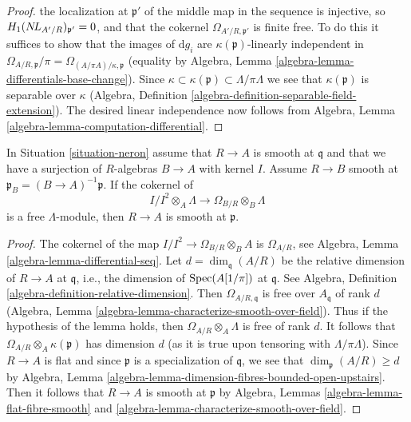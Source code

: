 \begin{proof}
the localization at $\mathfrak p'$ of the middle map in the sequence is
injective, so $H_1(\mathop{N\!L}\nolimits_{A'/R})_{\mathfrak p'} = 0$, and
that the cokernel $\Omega_{A'/R, \mathfrak p'}$ is finite free.
To do this it suffices to show
that the images of $\text{d}g_i$ are $\kappa(\mathfrak p)$-linearly
independent in
$\Omega_{A/R, \mathfrak p}/\pi = \Omega_{(A/\pi A)/\kappa, \mathfrak p}$
(equality by Algebra, Lemma \ref{algebra-lemma-differentials-base-change}).
Since $\kappa \subset \kappa(\mathfrak p) \subset \Lambda/\pi \Lambda$
we see that $\kappa(\mathfrak p)$ is separable over $\kappa$
(Algebra, Definition \ref{algebra-definition-separable-field-extension}).
The desired linear independence now follows from
Algebra, Lemma \ref{algebra-lemma-computation-differential}.
\end{proof}

\begin{lemma}
\label{lemma-neron-when-smooth}
In Situation \ref{situation-neron} assume that $R \to A$ is smooth
at $\mathfrak q$ and that we have a surjection of $R$-algebras
$B \to A$ with kernel $I$. Assume $R \to B$ smooth at
$\mathfrak p_B = (B \to A)^{-1}\mathfrak p$. If the cokernel of
$$
I/I^2 \otimes_A \Lambda \to \Omega_{B/R} \otimes_B \Lambda
$$
is a free $\Lambda$-module, then $R \to A$ is smooth at $\mathfrak p$.
\end{lemma}

\begin{proof}
The cokernel of the map $I/I^2 \to \Omega_{B/R} \otimes_B A$
is $\Omega_{A/R}$, see Algebra, Lemma \ref{algebra-lemma-differential-seq}.
Let $d = \dim_\mathfrak q(A/R)$ be the relative dimension of $R \to A$
at $\mathfrak q$, i.e., the dimension of $\mathop{\mathrm{Spec}}(A[1/\pi])$ at $\mathfrak q$.
See Algebra, Definition \ref{algebra-definition-relative-dimension}.
Then $\Omega_{A/R, \mathfrak q}$ is free over $A_\mathfrak q$ of rank $d$
(Algebra, Lemma \ref{algebra-lemma-characterize-smooth-over-field}).
Thus if the hypothesis of the lemma holds,
then $\Omega_{A/R} \otimes_A \Lambda$ is free of rank $d$.
It follows that $\Omega_{A/R} \otimes_A \kappa(\mathfrak p)$
has dimension $d$ (as it is true upon tensoring with $\Lambda/\pi \Lambda$).
Since $R \to A$ is flat and since $\mathfrak p$
is a specialization of $\mathfrak q$, we see that
$\dim_\mathfrak p(A/R) \geq d$ by Algebra, Lemma
\ref{algebra-lemma-dimension-fibres-bounded-open-upstairs}.
Then it follows that $R \to A$ is smooth at $\mathfrak p$ by
Algebra, Lemmas \ref{algebra-lemma-flat-fibre-smooth} and
\ref{algebra-lemma-characterize-smooth-over-field}.
\end{proof}

